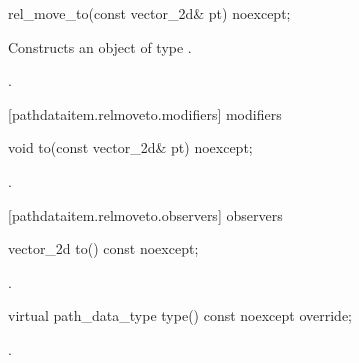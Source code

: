 \begin{itemdecl}
    rel_move_to(const vector_2d& pt) noexcept;
\end{itemdecl}
\begin{itemdescr}
	\pnum
	\effects
	Constructs an object of type .
	
	\pnum
	\postconditions
	.
\end{itemdescr}

 [pathdataitem.relmoveto.modifiers]{ modifiers}

\begin{itemdecl}
    void to(const vector_2d& pt) noexcept;
\end{itemdecl}
\begin{itemdescr}
	\pnum
	\postconditions
	.
	
\end{itemdescr}

 [pathdataitem.relmoveto.observers]{ observers}

\begin{itemdecl}
    vector_2d to() const noexcept;
\end{itemdecl}
\begin{itemdescr}
	\pnum
	\returns
	.

\end{itemdescr}

\begin{itemdecl}
    virtual path_data_type type() const noexcept override;
\end{itemdecl}
\begin{itemdescr}
	\pnum
	\returns
	.

\end{itemdescr}
